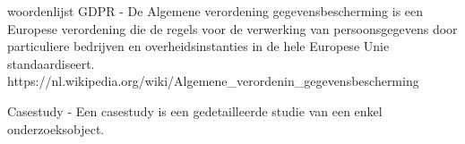 


\newpage
\bigskip
\bigskip
woordenlijst
GDPR - De Algemene verordening gegevensbescherming is een Europese verordening die de regels voor de verwerking van
persoonsgegevens door particuliere bedrijven en overheidsinstanties in de hele Europese Unie standaardiseert.
https://nl.wikipedia.org/wiki/Algemene\_verordenin\_gegevensbescherming

Casestudy -  Een casestudy is een gedetailleerde studie van een enkel onderzoeksobject.

